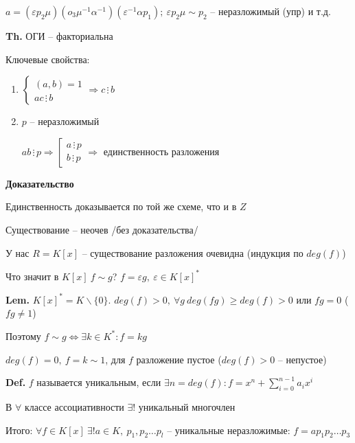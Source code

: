 \documentclass[14pt, letter paper]{article}
\begin{document}
$a = (\varepsilon p_2 \mu)(o_3 \mu^{-1} \alpha^{-1})(\varepsilon^{-1} \alpha p_1);\ \varepsilon p_2 \mu \sim p_2$ -- неразложимый (упр) и т.д.

\textbf{Th.} ОГИ -- факториальна

Ключевые свойства:

\begin{enumerate}
    \item $\begin{cases}
        (a, b) = 1 \\
        ac \, \vdots \, b
    \end{cases} \Rightarrow c \, \vdots \, b$
    \item $p$ -- неразложимый
    
    $ab \, \vdots \, p \Rightarrow \left[ \begin{gathered}
        a \, \vdots \, p \\
        b \, \vdots \, p
    \end{gathered} \right. \Rightarrow$ единственность разложения
\end{enumerate}

\begin{center}
    \textbf{Доказательство}
\end{center}

Единственность доказывается по той же схеме, что и в $Z$

Существование -- неочев /без доказательства/

У нас $R = K[x]$ -- существование разложения очевидна (индукция по $deg(f)$) 

\vspace{5mm}

Что значит в $K[x]\ f \sim g$? $f = \varepsilon g,\ \varepsilon \in K[x]^*$

\textbf{Lem.} $K[x]^* = K\backslash\{0\}$. $deg(f) > 0,\ \forall g\ deg(fg) \geq deg(f) > 0$ или $fg = 0$ ($fg \neq 1$)

Поэтому $f \sim g \Leftrightarrow \exists k \in K^* : f = kg$

$deg(f) = 0,\ f = k \sim 1$, для $f$ разложение пустое ($deg(f) > 0$ -- непустое)

\vspace{5mm}

\textbf{Def.} $f$ называется уникальным, если $\exists n = deg(f) : f = x^n + \sum\limits_{i = 0}^{n-1} a_ix^i$

В $\forall$ классе ассоциативности $\exists!$ уникальный многочлен

Итого: $\forall f \in K[x]\ \exists! a \in K,\ p_1, p_2 \ldots p_l$ -- уникальные неразложимые: $f = a p_1 p_2 \ldots p_3$
\end{document}
